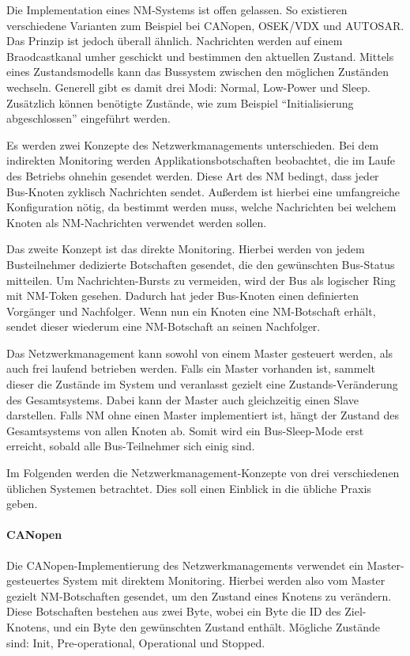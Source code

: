 \documentclass[
  a4paper,					    %
  twoside,
  DIV=calc,     				%
  bibliography=totoc,
  cleardoublepage=empty,
  ngerman,     					%
  final       					%
]{scrbook}
\begin{document}
Die Implementation eines NM-Systems ist offen gelassen. So existieren verschiedene Varianten zum Beispiel bei CANopen, OSEK/VDX und AUTOSAR. Das Prinzip ist jedoch überall ähnlich. Nachrichten werden auf einem Braodcastkanal umher geschickt und bestimmen den aktuellen Zustand. Mittels eines Zustandsmodells kann das Bussystem zwischen den möglichen Zuständen wechseln. Generell gibt es damit drei Modi: Normal, Low-Power und Sleep. Zusätzlich können benötigte Zustände, wie zum Beispiel "`Initialisierung abgeschlossen"' eingeführt werden.

Es werden zwei Konzepte des Netzwerkmanagements unterschieden. Bei dem indirekten Monitoring werden Applikationsbotschaften beobachtet, die im Laufe des Betriebs ohnehin gesendet werden. Diese Art des NM bedingt, dass jeder Bus-Knoten zyklisch Nachrichten sendet. Außerdem ist hierbei eine umfangreiche Konfiguration nötig, da bestimmt werden muss, welche Nachrichten bei welchem Knoten als NM-Nachrichten verwendet werden sollen.

Das zweite Konzept ist das direkte Monitoring. Hierbei werden von jedem Busteilnehmer dedizierte Botschaften gesendet, die den gewünschten Bus-Sta\-tus mitteilen. Um Nachrichten-Bursts zu vermeiden, wird der Bus als logischer Ring mit NM-Token gesehen. Dadurch hat jeder Bus-Knoten einen definierten Vorgänger und Nachfolger. Wenn nun ein Knoten eine NM-Botschaft erhält, sendet dieser wiederum eine NM-Botschaft an seinen Nachfolger.

Das Netzwerkmanagement kann sowohl von einem Master gesteuert werden, als auch frei laufend betrieben werden. Falls ein Master vorhanden ist, sammelt dieser die Zustände im System und veranlasst gezielt eine Zu\-stands-Ver\-än\-de\-rung des Gesamtsystems. Dabei kann der Master auch gleichzeitig einen Slave darstellen. Falls NM ohne einen Master implementiert ist, hängt der Zustand des Gesamtsystems von allen Knoten ab. Somit wird ein Bus-Sleep-Mode erst erreicht, sobald alle Bus-Teilnehmer sich einig sind.

Im Folgenden werden die Netzwerkmanagement-Konzepte von drei verschiedenen üblichen Systemen betrachtet. Dies soll einen Einblick in die übliche Praxis geben.

\paragraph{CANopen}
Die CANopen-Implementierung des Netzwerkmanagements verwendet ein Master-gesteuertes System mit direktem Monitoring. Hierbei werden also vom Master gezielt NM-Botschaften gesendet, um den Zustand eines Knotens zu verändern. Diese Botschaften bestehen aus zwei Byte, wobei ein Byte die ID des Ziel-Knotens, und ein Byte den gewünschten Zustand enthält. Mögliche Zustände sind: Init, Pre-operational, Operational und Stopped.\cite{nm_canopen}\cite{wiki:canopen}
\end{document}
